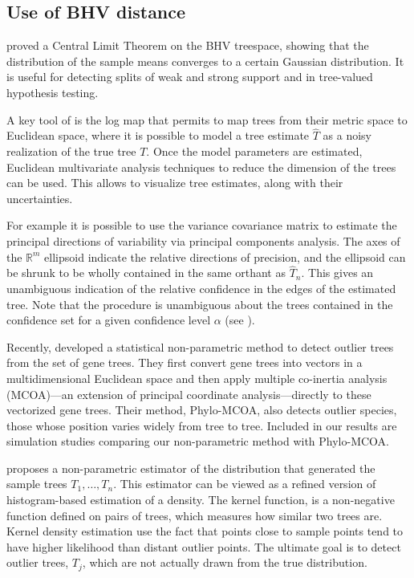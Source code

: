 \subsection{Use of BHV distance} \label{sec:means-and-variance}

\cite{barden2017logarithm} proved a Central Limit Theorem on the BHV treespace, showing that the distribution of the sample means converges to a certain Gaussian distribution. It is useful for detecting splits of weak and strong support and in tree-valued hypothesis testing.

A key tool of \cite{barden2014limiting}is  the log map  that permits to  map  trees  from  their  metric  space  to  Euclidean space, where it is possible to model a tree estimate $\hat T$ as a noisy realization of the true tree $T$. Once  the model parameters are estimated, Euclidean multivariate analysis techniques to reduce the dimension of the trees can be used. This allows to visualize tree estimates, along with their uncertainties.

For example it is possible to use the variance covariance matrix to  estimate  the  principal  directions  of  variability  via principal components analysis. The axes of the $\mathbb{R}^m$ ellipsoid indicate the relative directions of precision, and the ellipsoid can be shrunk  to be wholly contained in the same orthant as $\hat T_n$. This gives an unambiguous indication of the relative
confidence in the edges of the estimated tree. Note that the procedure is unambiguous about the trees contained in the confidence set for a given confidence level $\alpha$ (see \cite{willis2016confidence}).

Recently, \cite{de2012phylo} developed a statistical non-parametric method to detect outlier trees from the set of gene trees. They first convert gene trees into vectors in a multidimensional Euclidean space and then apply multiple co-inertia analysis (MCOA)—an extension of principal coordinate analysis—directly to these vectorized gene trees. Their method, Phylo-MCOA, also detects outlier species, those whose position varies widely from tree to tree. Included in our results are simulation studies comparing our non-parametric method with Phylo-MCOA.

\cite{weyenberg2014kdetrees}  proposes  a non-parametric estimator of the distribution that generated the sample trees $T_1,\ldots,T_n$.  This estimator can be viewed as a refined version of histogram-based estimation of a density. The kernel function, is a non-negative function defined on pairs of trees, which measures how similar two trees are. Kernel density estimation use the fact that points close to sample points tend to have higher likelihood than distant outlier points.  The ultimate goal is to detect outlier trees, $T_j$, which are not actually drawn from the true distribution.
%

